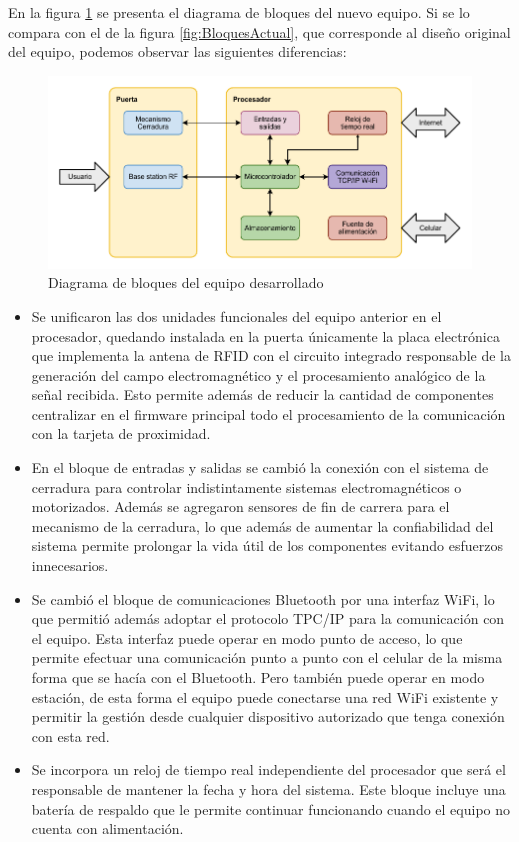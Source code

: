 En la figura \ref{fig:DiagramaBloques} se presenta el diagrama de bloques del nuevo equipo. Si se lo compara con el de la figura \ref{fig:BloquesActual}, que corresponde al diseño original del equipo, podemos observar las siguientes diferencias:

\begin{figure}[ht]
	\centering
	\includegraphics[width=\textwidth]{Figures/BloquesNuevo.pdf}
	\caption{Diagrama de bloques del equipo desarrollado}
	\label{fig:DiagramaBloques}
\end{figure}

\begin{itemize}
	\item Se unificaron las dos unidades funcionales del equipo anterior en el procesador, quedando instalada en la puerta únicamente la placa electrónica que implementa la antena de RFID con el circuito integrado responsable de la generación del campo electromagnético y el procesamiento analógico de la señal recibida. Esto permite además de reducir la cantidad de componentes centralizar en el firmware principal todo el procesamiento de la comunicación con la tarjeta de proximidad.
	\item En el bloque de entradas y salidas se cambió la conexión con el sistema de cerradura para  controlar indistintamente sistemas electromagnéticos o motorizados. Además se agregaron sensores de fin de carrera para el mecanismo de la cerradura, lo que además de aumentar la confiabilidad del sistema permite prolongar la vida útil de los componentes evitando esfuerzos innecesarios.
	\item Se cambió el bloque de comunicaciones Bluetooth por una interfaz WiFi, lo que permitió además adoptar el protocolo TPC/IP para la comunicación con el equipo. Esta interfaz puede operar en modo punto de acceso, lo que permite efectuar una comunicación punto a punto con el celular de la misma forma que se hacía con el Bluetooth. Pero también puede operar en modo estación, de esta forma el equipo puede conectarse una red WiFi existente y permitir la gestión desde cualquier dispositivo autorizado que tenga conexión con esta red.
	\item Se incorpora un reloj de tiempo real independiente del procesador que será el responsable de mantener la fecha y hora del sistema. Este bloque incluye una batería de respaldo que le permite continuar funcionando cuando el equipo no cuenta con alimentación.
\end{itemize}

